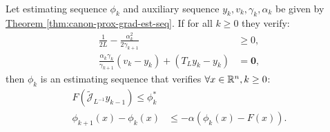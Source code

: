 \documentclass[12pt]{article}
\begin{document}
    \begin{theorem}\;\\
        Let estimating sequence $\phi_k$ and auxiliary sequence $y_k, v_k,\gamma_k, \alpha_k$  be given by 
        \hyperref[thm:canon-prox-grad-est-seq]{Theorem \ref*{thm:canon-prox-grad-est-seq}}. 
        If for all $k\ge 0$ they verify: 
        \begin{align*}
            \frac{1}{2L} - \frac{\alpha_k^2}{2 \gamma_{k + 1}} &\ge 0, 
            \\
            \frac{\alpha_k \gamma_k }{\gamma_{k + 1}} 
            (v_k - y_k) + (T_L y_k - y_k) &= \mathbf 0, 
        \end{align*}
        then $\phi_{k}$ is an estimating sequence that verifies $\forall x \in \mathbb R^n, k \ge 0$: 
        \begin{align*}
            F\left(
                \widetilde{\mathcal J}_{L^{-1}} y_{k - 1}
            \right)\le \phi_k^*
            \\
            \phi_{k + 1}(x) - \phi_k(x) &\le -\alpha(\phi_k(x) - F(x)). 
        \end{align*}
    \end{theorem}
\end{document}
